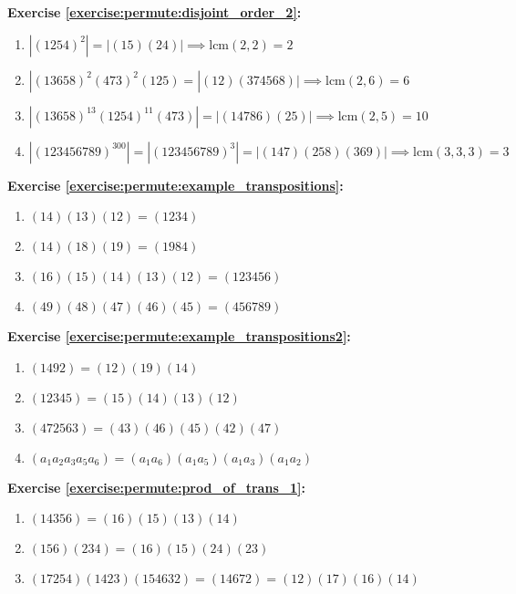 \noindent\textbf{Exercise \ref{exercise:permute:disjoint_order_2}:}
\begin{enumerate}[{a.}]
\item
$|(1254)^2| = |(15)(24)| \implies \mbox{lcm}(2, 2) = 2$ 

\item
$|(13658)^2(473)^2(125) = |(12)(374568)| \implies \mbox{lcm}(2, 6) = 6$

\item
$|(13658)^{13}(1254)^{11}(473)| = |(14786)(25)| \implies \mbox{lcm}(2, 5) = 10$

\item
$|(123456789)^{300}| = |(123456789)^3| = |(147)(258)(369)| \implies \mbox{lcm}(3, 3, 3) = 3$
\end{enumerate}

\noindent\textbf{Exercise \ref{exercise:permute:example_transpositions}:}
\begin{enumerate}[{a.}]
\item
$(14)(13)(12) = (1234)$

\item
$(14)(18)(19) = (1984)$

\item
$(16)(15)(14)(13)(12) = (123456)$

\item
$(49)(48)(47)(46)(45) = (456789)$
\end{enumerate}

\noindent\textbf{Exercise \ref{exercise:permute:example_transpositions2}:}
\begin{enumerate}[{a.}]
\item
$(1492) = (12)(19)(14)$

\item
$(12345) = (15)(14)(13)(12)$

\item
$(472563) = (43)(46)(45)(42)(47)$


\item
$(a_1a_2a_3a_5a_6) = (a_1a_6)(a_1a_5)(a_1a_3)(a_1a_2)$
\end{enumerate}

\noindent\textbf{Exercise \ref{exercise:permute:prod_of_trans_1}:}
\begin{enumerate}[{a.}]
\item
$(14356) = (16)(15)(13)(14)$

\item
$(156)(234) = (16)(15)(24)(23)$


\item
$(17254)(1423)(154632) = (14672) = (12)(17)(16)(14)$
\end{enumerate}

